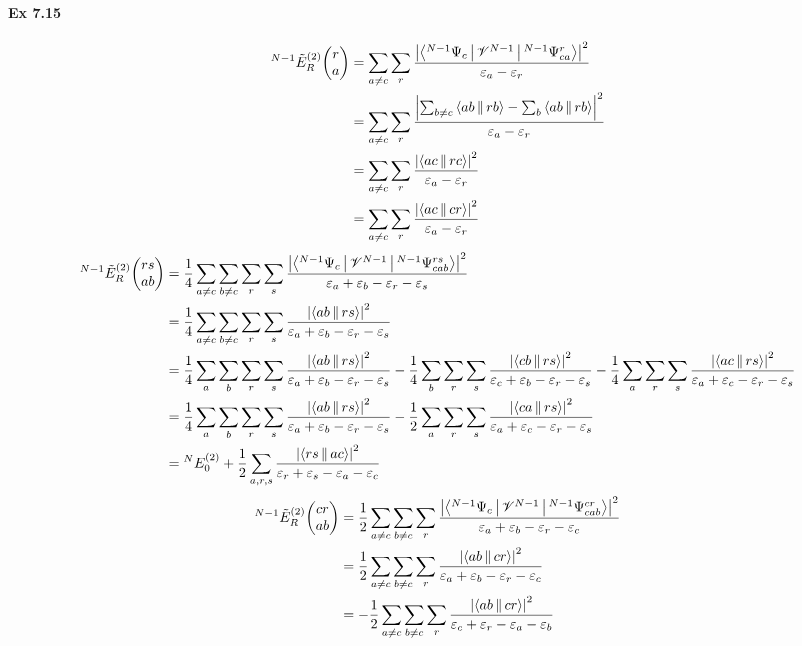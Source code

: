 \documentclass[a4paper]{article}
\newcommand{\ex}[1]{\paragraph{Ex #1}}
\numberwithin{equation}{subsection}
\begin{document}
\ex{7.15}
\begin{align}
{^{N-1}}\tilde{E}_R^{(2)}\mqty(r\\ a) 
&= \sum_{a\neq c}\sum_r \dfrac{\abs{
		\Braket{^{N-1}\Psi_c | \mathscr{V}^{N-1} | ^{N-1}\Psi_{ca}^r} 
	}^2	}{\varepsilon_a - \varepsilon_r} \notag\\
&= \sum_{a\neq c}\sum_r \dfrac{\abs{
		\sum_{b\neq c} \Braket{ab||rb} - \sum_b \Braket{ab||rb}
	}^2	}{\varepsilon_a - \varepsilon_r} \notag\\
&= \sum_{a\neq c}\sum_r \dfrac{\abs{\Braket{ac||rc}	}^2	}{\varepsilon_a - \varepsilon_r} \notag\\
&= \sum_{a\neq c}\sum_r \dfrac{\abs{\Braket{ac||cr}	}^2	}{\varepsilon_a - \varepsilon_r}
\end{align}
\begin{align}
{^{N-1}}\tilde{E}_R^{(2)}\mqty(rs\\ ab) 
&= \dfrac{1}{4}\sum_{a\neq c}\sum_{b\neq c}\sum_r\sum_s \dfrac{\abs{
		\Braket{^{N-1}\Psi_c | \mathscr{V}^{N-1} | ^{N-1}\Psi_{cab}^{rs}} 
	}^2	}{\varepsilon_a + \varepsilon_b - \varepsilon_r - \varepsilon_s} \notag\\
&= \dfrac{1}{4}\sum_{a\neq c}\sum_{b\neq c}\sum_r\sum_s \dfrac{\abs{
		\Braket{ab||rs}
	}^2	}{\varepsilon_a + \varepsilon_b - \varepsilon_r - \varepsilon_s} \\
&= \dfrac{1}{4}\sum_{a}\sum_{b}\sum_r\sum_s \dfrac{\abs{\Braket{ab||rs}}^2	}{\varepsilon_a + \varepsilon_b - \varepsilon_r - \varepsilon_s}
- \dfrac{1}{4}\sum_{b}\sum_r\sum_s \dfrac{\abs{\Braket{cb||rs}}^2	}{\varepsilon_c + \varepsilon_b - \varepsilon_r - \varepsilon_s}
- \dfrac{1}{4}\sum_{a}\sum_r\sum_s \dfrac{\abs{\Braket{ac||rs}}^2	}{\varepsilon_a + \varepsilon_c - \varepsilon_r - \varepsilon_s} \notag\\
&= \dfrac{1}{4}\sum_{a}\sum_{b}\sum_r\sum_s \dfrac{\abs{\Braket{ab||rs}}^2	}{\varepsilon_a + \varepsilon_b - \varepsilon_r - \varepsilon_s}
- \dfrac{1}{2}\sum_{a}\sum_r\sum_s \dfrac{\abs{\Braket{ca||rs}}^2	}{\varepsilon_a + \varepsilon_c - \varepsilon_r - \varepsilon_s} \notag\\
&= {^N}E_0^{(2)}
+ \dfrac{1}{2}\sum_{a,r,s} \dfrac{\abs{\Braket{rs||ac}}^2	}{\varepsilon_r + \varepsilon_s - \varepsilon_a - \varepsilon_c}
\end{align}
\begin{align}
{^{N-1}}\tilde{E}_R^{(2)}\mqty(cr\\ ab) 
&= \dfrac{1}{2}\sum_{a\neq c}\sum_{b\neq c}\sum_r \dfrac{\abs{
		\Braket{^{N-1}\Psi_c | \mathscr{V}^{N-1} | ^{N-1}\Psi_{cab}^{cr}} 
	}^2	}{\varepsilon_a + \varepsilon_b - \varepsilon_r - \varepsilon_c} \notag\\
&= \dfrac{1}{2}\sum_{a\neq c}\sum_{b\neq c}\sum_r \dfrac{\abs{
		\Braket{ab||cr} 
	}^2	}{\varepsilon_a + \varepsilon_b - \varepsilon_r - \varepsilon_c} \notag\\
&= -\dfrac{1}{2}\sum_{a\neq c}\sum_{b\neq c}\sum_r \dfrac{\abs{
		\Braket{ab||cr} 
	}^2	}{\varepsilon_c + \varepsilon_r - \varepsilon_a - \varepsilon_b} 
\end{align}
\end{document}
